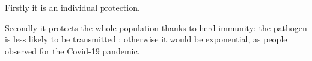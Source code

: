 \documentclass{article}
\begin{document}

                











            Firstly it is an individual protection.

            Secondly it protects the whole population thanks to herd immunity: the pathogen is less likely to be transmitted ; otherwise it would be exponential,
                as people observed for the Covid-19 pandemic.

  





\end{document}
